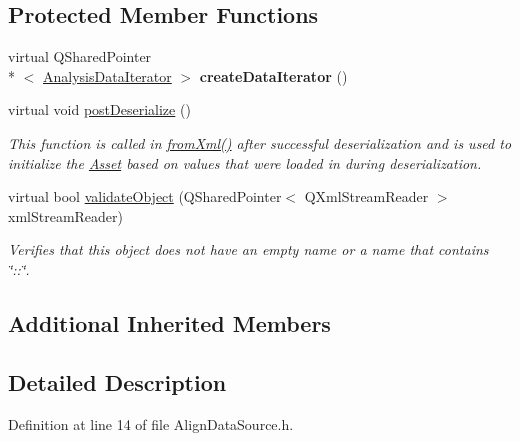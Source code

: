 \subsection*{Protected Member Functions}
\begin{DoxyCompactItemize}
\item 
\hypertarget{class_picto_1_1_align_data_source_ac31e81f976c66d65f00ddab62dcc93bf}{virtual Q\-Shared\-Pointer\\*
$<$ \hyperlink{class_picto_1_1_analysis_data_iterator}{Analysis\-Data\-Iterator} $>$ {\bfseries create\-Data\-Iterator} ()}\label{class_picto_1_1_align_data_source_ac31e81f976c66d65f00ddab62dcc93bf}

\item 
virtual void \hyperlink{class_picto_1_1_align_data_source_ac13d9419b22333299c93daa964b0d855}{post\-Deserialize} ()
\begin{DoxyCompactList}\small\item\em This function is called in \hyperlink{class_picto_1_1_asset_a8bed4da09ecb1c07ce0dab313a9aba67}{from\-Xml()} after successful deserialization and is used to initialize the \hyperlink{class_picto_1_1_asset}{Asset} based on values that were loaded in during deserialization. \end{DoxyCompactList}\item 
\hypertarget{class_picto_1_1_align_data_source_af81f83b2691119af53ffcbaa5e6ac1ac}{virtual bool \hyperlink{class_picto_1_1_align_data_source_af81f83b2691119af53ffcbaa5e6ac1ac}{validate\-Object} (Q\-Shared\-Pointer$<$ Q\-Xml\-Stream\-Reader $>$ xml\-Stream\-Reader)}\label{class_picto_1_1_align_data_source_af81f83b2691119af53ffcbaa5e6ac1ac}

\begin{DoxyCompactList}\small\item\em Verifies that this object does not have an empty name or a name that contains \char`\"{}\-::\char`\"{}. \end{DoxyCompactList}\end{DoxyCompactItemize}
\subsection*{Additional Inherited Members}


\subsection{Detailed Description}


Definition at line 14 of file Align\-Data\-Source.\-h.



